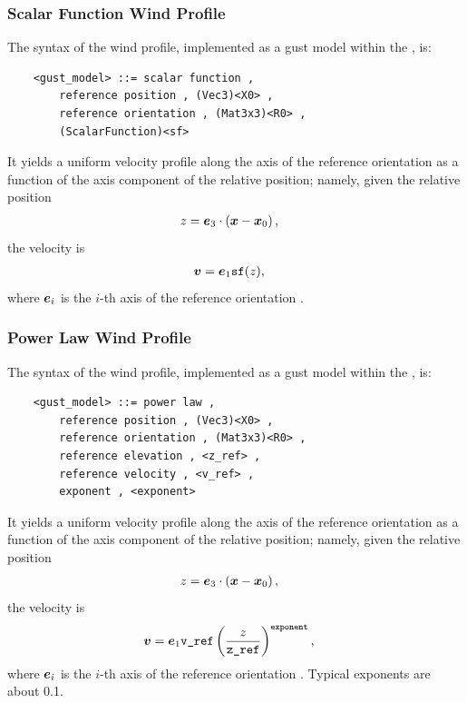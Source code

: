 \subsubsection{Scalar Function Wind Profile}
The syntax of the  wind profile,
implemented as a gust model within the , is:
\begin{verbatim}
    <gust_model> ::= scalar function ,
        reference position , (Vec3)<X0> ,
        reference orientation , (Mat3x3)<R0> ,
        (ScalarFunction)<sf>
\end{verbatim}
It yields a uniform velocity profile along the  axis of the
reference orientation as a function of the  axis component
of the relative position; namely, given the relative position
\begin{align}
	z &= \boldsymbol{e}_3 \cdot \left( \boldsymbol{x} - \boldsymbol{x}_0 \right)
	,
\end{align}
the velocity is
\begin{align}
	\boldsymbol{v}
	&=
	\boldsymbol{e}_1 \texttt{sf}(z)
	,
\end{align}
where $\boldsymbol{e}_i$ is the $i$-th axis of the reference orientation .



\subsubsection{Power Law Wind Profile}
The syntax of the  wind profile, implemented as a gust model
within the , is:
\begin{verbatim}
    <gust_model> ::= power law ,
        reference position , (Vec3)<X0> ,
        reference orientation , (Mat3x3)<R0> ,
        reference elevation , <z_ref> ,
        reference velocity , <v_ref> ,
        exponent , <exponent>
\end{verbatim}
It yields a uniform velocity profile along the  axis of the
reference orientation as a function of the  axis component
of the relative position; namely, given the relative position
\begin{align}
	z &= \boldsymbol{e}_3 \cdot \left( \boldsymbol{x} - \boldsymbol{x}_0 \right)
	,
\end{align}
the velocity is
\begin{align}
	\boldsymbol{v}
	&=
	\boldsymbol{e}_1 \texttt{v\_ref} \left( \frac{z}{\texttt{z\_ref}} \right)^{\texttt{exponent}}
	,
\end{align}
where $\boldsymbol{e}_i$ is the $i$-th axis of the reference orientation .
Typical exponents are about 0.1.



